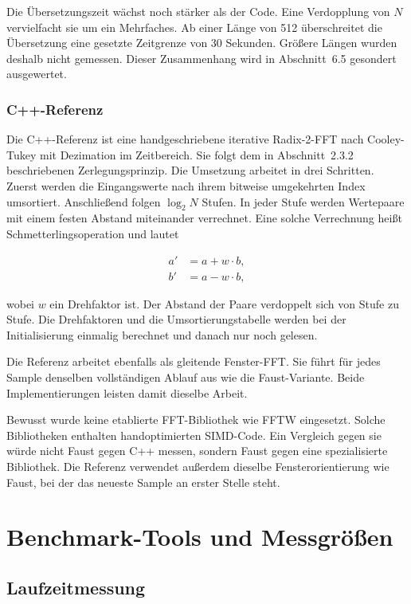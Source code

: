 Die Übersetzungszeit wächst noch stärker als der Code. Eine Verdopplung von
$N$ vervielfacht sie um ein Mehrfaches. Ab einer Länge von 512 überschreitet
die Übersetzung eine gesetzte Zeitgrenze von 30 Sekunden. Größere Längen
wurden deshalb nicht gemessen. Dieser Zusammenhang wird in Abschnitt~6.5
gesondert ausgewertet.

\subsubsection*{C++-Referenz}

Die C++-Referenz ist eine handgeschriebene iterative Radix-2-FFT nach
Cooley-Tukey mit Dezimation im Zeitbereich. Sie folgt dem in
Abschnitt~2.3.2 beschriebenen Zerlegungsprinzip. Die Umsetzung arbeitet in
drei Schritten. Zuerst werden die Eingangswerte nach ihrem bitweise
umgekehrten Index umsortiert. Anschließend folgen $\log_2 N$ Stufen. In jeder
Stufe werden Wertepaare mit einem festen Abstand miteinander verrechnet. Eine
solche Verrechnung heißt Schmetterlingsoperation und lautet

\begin{align}
a' &= a + w \cdot b, \\
b' &= a - w \cdot b,
\end{align}

wobei $w$ ein Drehfaktor ist. Der Abstand der Paare verdoppelt sich von Stufe
zu Stufe. Die Drehfaktoren und die Umsortierungstabelle werden bei der
Initialisierung einmalig berechnet und danach nur noch gelesen.

Die Referenz arbeitet ebenfalls als gleitende Fenster-FFT. Sie führt für
jedes Sample denselben vollständigen Ablauf aus wie die Faust-Variante.
Beide Implementierungen leisten damit dieselbe Arbeit.

Bewusst wurde keine etablierte FFT-Bibliothek wie FFTW eingesetzt. Solche
Bibliotheken enthalten handoptimierten SIMD-Code. Ein Vergleich gegen sie
würde nicht Faust gegen C++ messen, sondern Faust gegen eine spezialisierte
Bibliothek. Die Referenz verwendet außerdem dieselbe Fensterorientierung wie
Faust, bei der das neueste Sample an erster Stelle steht.


\section{Benchmark-Tools und Messgrößen}
\label{sec:messgroessen}

\subsection{Laufzeitmessung}

